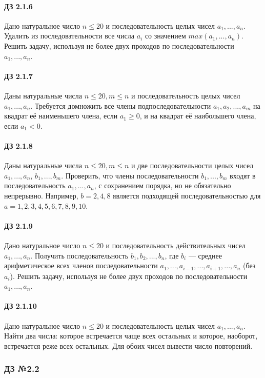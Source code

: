 \documentclass[12pt,a4paper]{report}
\begin{document}
\paragraph*{ДЗ 2.1.6} Дано натуральное число $n \le 20$ и последовательность целых чисел $a_1, ..., a_n$. Удалить из последовательности все числа $a_i$ со значением $max(a_1, ..., a_n)$. Решить задачу, используя не более двух проходов по последовательности $a_1, ..., a_n$.
\paragraph*{ДЗ 2.1.7} Даны натуральные числа $n \le 20, m \le n$ и последовательность целых чисел $a_1, ..., a_n$. Требуется домножить все члены подпоследовательности $a_1, a_2, ..., a_{m}$ на квадрат её наименьшего члена, если $a_1 \ge 0$, и на квадрат её наибольшего члена, если $a_1 < 0$.
\paragraph*{ДЗ 2.1.8} Даны натуральные числа $n \le 20, m \le n$ и две последовательности целых чисел $a_1, ..., a_n$, $b_1, ..., b_m$. Проверить, что члены последовательности $b_1, ..., b_m$ входят в последовательность $a_1, ..., a_n$, с сохранением порядка, но не обязательно непрерывно. Например, $b=2,4,8$ является подходящей последовательностью для $a=1,2,3,4,5,6,7,8,9,10$.
\paragraph*{ДЗ 2.1.9} Дано натуральное число $n \le 20$ и последовательность действительных чисел $a_1, ..., a_n$. Получить последовательность $b_1, b_2, ..., b_n$, где $b_i$ --- среднее арифметическое всех членов последовательности $a_1, ..., a_{i-1}, ..., a_{i+1}, ..., a_n$ (без $a_i$). Решить задачу, используя не более двух проходов по последовательности $a_1, ..., a_n$.
\paragraph*{ДЗ 2.1.10} Дано натуральное число $n \le 20$ и последовательность целых чисел $a_1, ..., a_n$. Найти два числа: которое встречается чаще всех остальных и которое, наоборот, встречается реже всех остальных. Для обоих чисел вывести число повторений. 

\clearpage
\subsubsection*{ДЗ №2.2}
\end{document}
